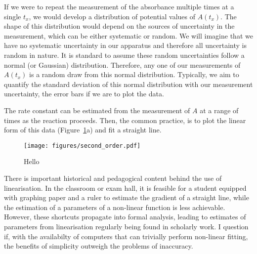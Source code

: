 \documentclass[reprint,superscriptaddress,nobibnotes,amsmath,amssymb]{revtex4-2}
\begin{document}
If we were to repeat the measurement of the absorbance multiple times at a single $t_x$, we would develop a distribution of potential values of $A(t_x)$.
The shape of this distribution would depend on the sources of uncertainty in the measurement, which can be either systematic or random. 
We will imagine that we have no systematic uncertainty in our apparatus and therefore all uncertainty is random in nature. 
It is standard to assume these random uncertainties follow a normal (or Gaussian) distribution. 
Therefore, any one of our measurements of $A(t_x)$ is a random draw from this normal distribution.
Typically, we aim to quantify the standard deviation of this normal distribution with our measurement uncertainty, the error bars if we are to plot the data. 

The rate constant can be estimated from the measurement of $A$ at a range of times as the reaction proceeds.
Then, the common practice, is to plot the linear form of this data (Figure~\ref{fig:second_order}a) and fit a straight line. 

%
\begin{figure}
  \texttt{[image: figures/second\_order.pdf]}
  \caption{
    Hello
    }
  \label{fig:second_order}
\end{figure}
%



There is important historical and pedagogical content behind the use of linearisation. 
In the classroom or exam hall, it is feasible for a student equipped with graphing paper and a ruler to estimate the gradient of a straight line, while the estimation of a parameters of a non-linear function is less achievable. 
However, these shortcuts propagate into formal analysis, leading to estimates of parameters from linearisation regularly being found in scholarly work. 
I question if, with the availabilty of computers that can trivially perform non-linear fitting, the benefits of simplicity outweigh the problems of inaccuracy.



\end{document}
